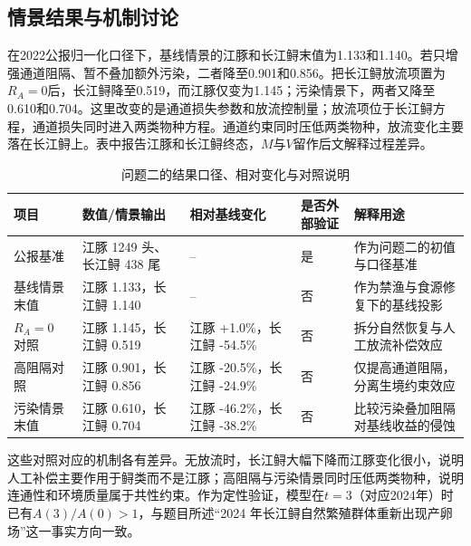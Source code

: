\subsection{情景结果与机制讨论}
在2022公报归一化口径下，基线情景的江豚和长江鲟末值为1.133和1.140。若只增强通道阻隔、暂不叠加额外污染，二者降至0.901和0.856。把长江鲟放流项置为$R_A=0$后，长江鲟降至0.519，而江豚仅变为1.145；污染情景下，两者又降至0.610和0.704。这里改变的是通道损失参数和放流控制量；放流项位于长江鲟方程，通道损失同时进入两类物种方程。通道约束同时压低两类物种，放流变化主要落在长江鲟上。表中报告江豚和长江鲟终态，$M$与$V$留作后文解释过程差异。
\begin{table}[htbp]
\centering
\caption{问题二的结果口径、相对变化与对照说明}
\label{tab:q2_result}
\begin{tabularx}{0.95\textwidth}{>{\raggedright\arraybackslash}p{2.2cm} >{\raggedright\arraybackslash}p{3.6cm} >{\raggedright\arraybackslash}p{2.8cm} >{\raggedright\arraybackslash}p{1.7cm} X}
\toprule
项目 & 数值/情景输出 & 相对基线变化 & 是否外部验证 & 解释用途 \\
\midrule
2022 公报基准 & 江豚 1249 头、长江鲟 438 尾 & -- & 是 & 作为问题二的初值与口径基准 \\
基线情景末值 & 江豚 1.133，长江鲟 1.140 & -- & 否 & 作为禁渔与食源修复下的基线投影 \\
$R_A=0$ 对照 & 江豚 1.145，长江鲟 0.519 & 江豚 +1.0\%，长江鲟 -54.5\% & 否 & 拆分自然恢复与人工放流补偿效应 \\
高阻隔对照 & 江豚 0.901，长江鲟 0.856 & 江豚 -20.5\%，长江鲟 -24.9\% & 否 & 仅提高通道阻隔，分离生境约束效应 \\
污染情景末值 & 江豚 0.610，长江鲟 0.704 & 江豚 -46.2\%，长江鲟 -38.2\% & 否 & 比较污染叠加阻隔对基线收益的侵蚀 \\
\bottomrule
\end{tabularx}
\end{table}
这些对照对应的机制各有差异。无放流时，长江鲟大幅下降而江豚变化很小，说明人工补偿主要作用于鲟类而不是江豚；高阻隔与污染情景同时压低两类物种，说明连通性和环境质量属于共性约束。作为定性验证，模型在$t=3$（对应2024年）时已有$A(3)/A(0)>1$，与题目所述“2024 年长江鲟自然繁殖群体重新出现产卵场”这一事实方向一致。

